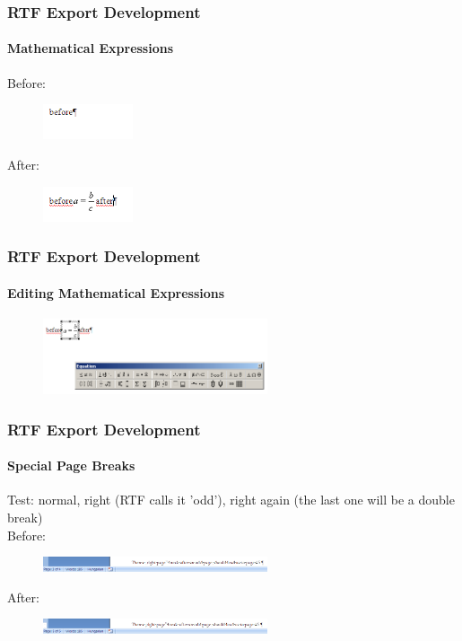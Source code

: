 \documentclass[hyperref={pdfpagelabels=false}]{beamer}
\begin{document}
\begin{frame}
\frametitle{RTF Export Development}
\framesubtitle{Mathematical Expressions}
Before:
\begin{figure}[H]
\includegraphics[width=100px,keepaspectratio]{pic/math-old.png}
\end{figure}
After:
\begin{figure}[H]
\includegraphics[width=100px,keepaspectratio]{pic/math-new.png}
\end{figure}
\end{frame}

\begin{frame}
\frametitle{RTF Export Development}
\framesubtitle{Editing Mathematical Expressions}
\begin{figure}[H]
\includegraphics[width=250px,keepaspectratio]{pic/math-new-edit.png}
\end{figure}
\end{frame}

\begin{frame}
\frametitle{RTF Export Development}
\framesubtitle{Special Page Breaks}
Test: normal, right (RTF calls it 'odd'), right again (the last one will be a double break) \\ Before:
\begin{figure}[H]
\includegraphics[width=250px,keepaspectratio]{pic/pagebreak-special-old.png}
\end{figure}
After:
\begin{figure}[H]
\includegraphics[width=250px,keepaspectratio]{pic/pagebreak-special-new.png}
\end{figure}
\end{frame}
\end{document}
